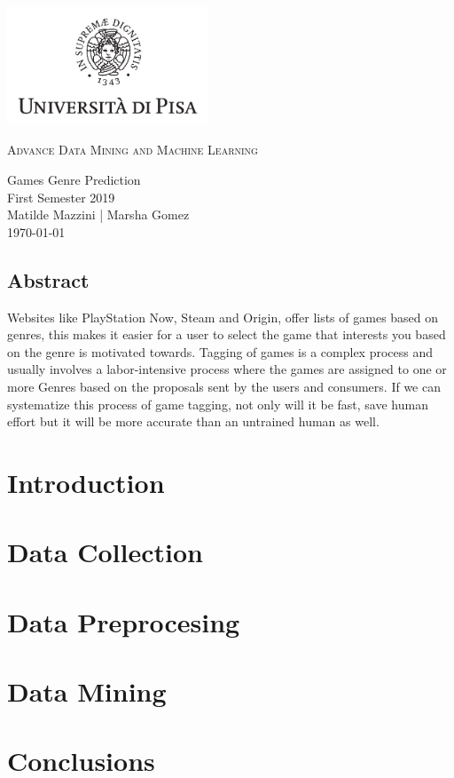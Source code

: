 \documentclass{book}
\author{Matilde Mazzini | Marsha Gomez Gomez}
\begin{document}
\begin{titlepage}
    \centering
    \includegraphics[width=6cm]{unipi}
    \vfill
    \vspace{1.5cm}
    {\huge\textsc{Advance Data Mining and Machine Learning}\par}
    {\Large
        Games Genre Prediction\\
        First Semester 2019\\
        \vskip2cm
        Matilde Mazzini | Marsha Gomez\\
        \vskip2cm
        \today
    }    
    \vfill
    \vfill
\end{titlepage}
    \tableofcontents
    
    
    \section*{Abstract}
    Websites like PlayStation Now, Steam and Origin, offer lists of games based on genres, this makes it easier for a user to select the game that interests you based on the genre is motivated towards. Tagging of games is a complex process and usually involves a labor-intensive process where the games are assigned to one or more Genres based on the proposals sent by the users and consumers. If we can systematize this process of game tagging, not only will it be fast, save human effort but it will be more accurate than an untrained human as well.

    \chapter{Introduction}
    \chapter{Data Collection}
    \chapter{Data Preprocesing}
    \chapter{Data Mining}
    \chapter{Conclusions}
\end{document}

